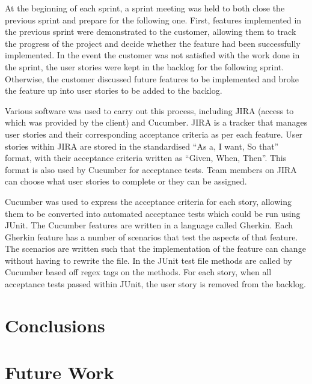 \documentclass[a4paper, 12pt]{article}
\begin{document}
At the beginning of each sprint, a sprint meeting was held to both close the previous sprint and prepare for the following one. First, features implemented in the previous sprint were demonstrated to the customer, allowing them to track the progress of the project and decide whether the feature had been successfully implemented. In the event the customer was not satisfied with the work done in the sprint, the user stories were kept in the backlog for the following sprint. Otherwise, the customer discussed future features to be implemented and broke the feature up into user stories to be added to the backlog.

Various software was used to carry out this process, including JIRA (access to which was provided by the client) and Cucumber. JIRA is a tracker that manages user stories and their corresponding acceptance criteria as per each feature. User stories within JIRA are stored in the standardised “As a, I want, So that” format, with their acceptance criteria written as “Given, When, Then”. This format is also used by Cucumber for acceptance tests. Team members on JIRA can choose what user stories to complete or they can be assigned.

Cucumber was used to express the acceptance criteria for each story, allowing them to be converted into automated acceptance tests which could be run using JUnit. The Cucumber features are written in a language called Gherkin. Each Gherkin feature has a number of scenarios that test the aspects of that feature. The scenarios are written such that the implementation of the feature can change without having to rewrite the file. In the JUnit test file methods are called by Cucumber based off regex tags on the methods. For each story, when all acceptance tests passed within JUnit, the user story is removed from the backlog.

\newpage

\section{Conclusions}
\label{sec:conclusions}

\newpage

\section{Future Work}

\newpage

\sloppy
\printbibliography
\end{document}

